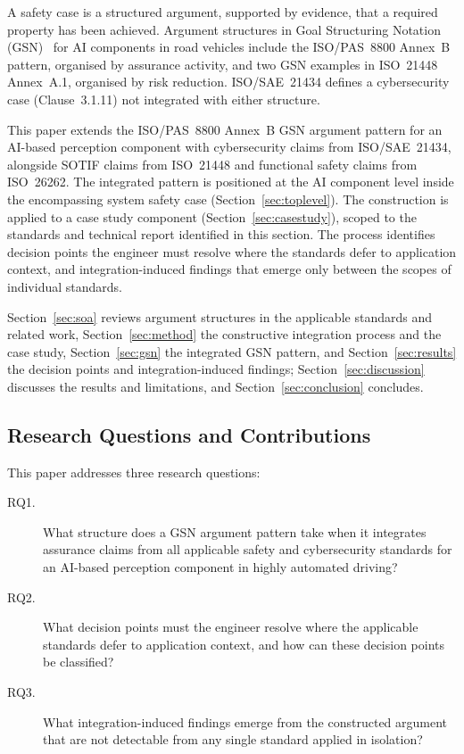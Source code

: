 \documentclass[runningheads]{llncs}
\newcommand{\new}[1]{#1}
\newcommand{\new}[1]{\textcolor{blue}{#1}}
\newcommand{\crev}[1]{\textcolor{blue!75!black}{#1}}
\newcommand{\crev}[1]{#1}
\begin{document}
	A safety case is a structured argument, supported by evidence, that a required property has been achieved. \new{Argument structures in Goal Structuring Notation (GSN)~\cite{GSNstandard} for AI components in road vehicles include the ISO/PAS~8800 Annex~B pattern, organised by assurance activity, and two GSN examples in ISO~21448 Annex~A.1, organised by risk reduction.} ISO/SAE~21434 defines a cybersecurity case (Clause~3.1.11) not integrated with either structure.
	
	{\sloppy This paper \new{extends the ISO/PAS~8800 Annex~B GSN argument pattern for an AI-based perception component with cybersecurity claims from ISO/SAE~21434, alongside SOTIF claims from ISO~21448 and functional safety claims from ISO~26262. The integrated pattern is positioned at the AI component level inside the encompassing system safety case (Section~\ref{sec:toplevel}).} The construction is applied to a case study component (Section~\ref{sec:casestudy}), scoped to the standards and technical report identified in this section. The process identifies \new{decision points the engineer must resolve where the standards defer to application context, and integration-induced findings that emerge only between the scopes of individual standards.}\par}
	
	\crev{Section~\ref{sec:soa} reviews argument structures in the applicable standards and related work, Section~\ref{sec:method} the constructive integration process and the case study, Section~\ref{sec:gsn} the integrated GSN pattern, and Section~\ref{sec:results} the decision points and integration-induced findings; Section~\ref{sec:discussion} discusses the results and limitations, and Section~\ref{sec:conclusion} concludes.}
	
	\subsection{Research Questions and Contributions}
	\label{sec:rqs}
	
	This paper addresses three research questions:
	\begin{description}
		\item[RQ1.] What structure does a GSN argument pattern take when it integrates assurance claims from all applicable safety and cybersecurity standards for an AI-based perception component in highly automated driving?
		\item[RQ2.] What decision points must the engineer resolve where the applicable standards defer to application context, and how can these decision points be classified?
		\item[RQ3.] What integration-induced findings emerge from the constructed argument that are not detectable from any single standard applied in isolation?
	\end{description}
	
\end{document}
